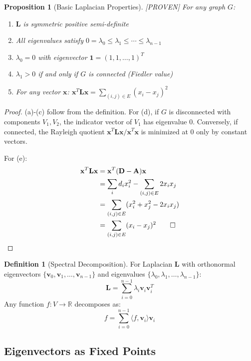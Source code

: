 \documentclass[11pt,a4paper]{article}
\newtheorem{proposition}[theorem]{Proposition}
\theoremstyle{definition}
\newtheorem{definition}[theorem]{Definition}
\theoremstyle{remark}
\newcommand{\R}{\mathbb{R}}
\newcommand{\inner}[2]{\langle #1, #2 \rangle}
\newcommand{\Lap}{\mathbf{L}}
\newcommand{\Adj}{\mathbf{A}}
\newcommand{\Deg}{\mathbf{D}}
\newcommand{\proven}{\textcolor{green!50!black}{[PROVEN]}}
\begin{document}
\begin{proposition}[Basic Laplacian Properties] \proven
\label{prop:laplacian-basic}
For any graph $G$:
\begin{enumerate}[label=(\alph*)]
    \item $\Lap$ is symmetric positive semi-definite
    \item All eigenvalues satisfy $0 = \lambda_0 \leq \lambda_1 \leq \cdots \leq \lambda_{n-1}$
    \item $\lambda_0 = 0$ with eigenvector $\mathbf{1} = (1, 1, \ldots, 1)^T$
    \item $\lambda_1 > 0$ if and only if $G$ is connected (Fiedler value)
    \item For any vector $\mathbf{x}$: $\mathbf{x}^T \Lap \mathbf{x} = \sum_{(i,j) \in E} (x_i - x_j)^2$
\end{enumerate}
\end{proposition}

\begin{proof}
(a)-(c) follow from the definition. For (d), if $G$ is disconnected with components $V_1, V_2$, the indicator vector of $V_1$ has eigenvalue 0. Conversely, if connected, the Rayleigh quotient $\mathbf{x}^T \Lap \mathbf{x} / \mathbf{x}^T \mathbf{x}$ is minimized at 0 only by constant vectors.

For (e):
\begin{align*}
\mathbf{x}^T \Lap \mathbf{x} &= \mathbf{x}^T (\Deg - \Adj) \mathbf{x} \\
&= \sum_i d_i x_i^2 - \sum_{(i,j) \in E} 2x_i x_j \\
&= \sum_{(i,j) \in E} (x_i^2 + x_j^2 - 2x_i x_j) \\
&= \sum_{(i,j) \in E} (x_i - x_j)^2 \qed
\end{align*}
\end{proof}

\begin{definition}[Spectral Decomposition]
For Laplacian $\Lap$ with orthonormal eigenvectors $\{\mathbf{v}_0, \mathbf{v}_1, \ldots, \mathbf{v}_{n-1}\}$ and eigenvalues $\{\lambda_0, \lambda_1, \ldots, \lambda_{n-1}\}$:
\[
\Lap = \sum_{i=0}^{n-1} \lambda_i \mathbf{v}_i \mathbf{v}_i^T
\]
Any function $f: V \to \R$ decomposes as:
\[
f = \sum_{i=0}^{n-1} \inner{f}{\mathbf{v}_i} \mathbf{v}_i
\]
\end{definition}

\subsection{Eigenvectors as Fixed Points}
\end{document}
